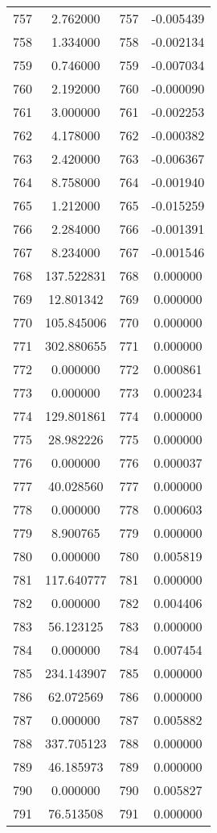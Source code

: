 \documentclass[12pt]{article}
\begin{document}
\begin{longtable}{@{}cccc@{}}
757 & 2.762000 & 757 & -0.005439 \\
758 & 1.334000 & 758 & -0.002134 \\
759 & 0.746000 & 759 & -0.007034 \\
760 & 2.192000 & 760 & -0.000090 \\
761 & 3.000000 & 761 & -0.002253 \\
762 & 4.178000 & 762 & -0.000382 \\
763 & 2.420000 & 763 & -0.006367 \\
764 & 8.758000 & 764 & -0.001940 \\
765 & 1.212000 & 765 & -0.015259 \\
766 & 2.284000 & 766 & -0.001391 \\
767 & 8.234000 & 767 & -0.001546 \\
768 & 137.522831 & 768 & 0.000000 \\
769 & 12.801342 & 769 & 0.000000 \\
770 & 105.845006 & 770 & 0.000000 \\
771 & 302.880655 & 771 & 0.000000 \\
772 & 0.000000 & 772 & 0.000861 \\
773 & 0.000000 & 773 & 0.000234 \\
774 & 129.801861 & 774 & 0.000000 \\
775 & 28.982226 & 775 & 0.000000 \\
776 & 0.000000 & 776 & 0.000037 \\
777 & 40.028560 & 777 & 0.000000 \\
778 & 0.000000 & 778 & 0.000603 \\
779 & 8.900765 & 779 & 0.000000 \\
780 & 0.000000 & 780 & 0.005819 \\
781 & 117.640777 & 781 & 0.000000 \\
782 & 0.000000 & 782 & 0.004406 \\
783 & 56.123125 & 783 & 0.000000 \\
784 & 0.000000 & 784 & 0.007454 \\
785 & 234.143907 & 785 & 0.000000 \\
786 & 62.072569 & 786 & 0.000000 \\
787 & 0.000000 & 787 & 0.005882 \\
788 & 337.705123 & 788 & 0.000000 \\
789 & 46.185973 & 789 & 0.000000 \\
790 & 0.000000 & 790 & 0.005827 \\
791 & 76.513508 & 791 & 0.000000 \\

\end{longtable}
\end{document}
